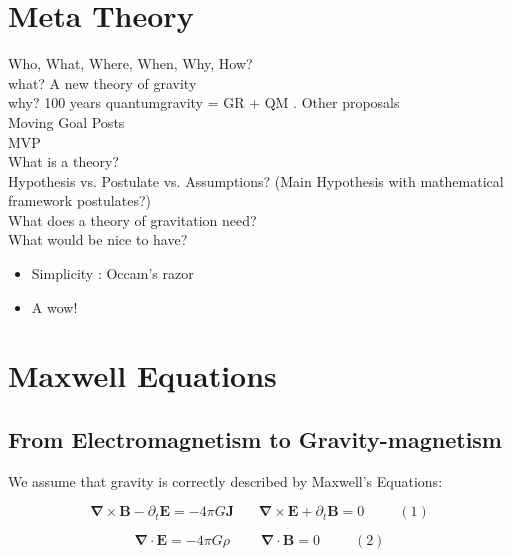 \documentclass {article}
\renewcommand\vec{\mathbf}
\let\OldS\nabla
\renewcommand{\nabla}{\boldsymbol{\OldS}}
\begin{document}
\section{Meta Theory}

Who, What, Where, When, Why, How?
\\[0.15in]
what?    A new theory of  gravity
\\
why?   100 years quantumgravity = GR + QM . Other proposals
\\[1in]

Moving Goal Posts
\\

MVP
\\

What is a theory?
\\[1in]

Hypothesis vs. Postulate vs. Assumptions? (Main Hypothesis with mathematical framework postulates?)
\\[1in]



What does a theory of gravitation need?
\\[2in]

What would be nice to have? 
\begin{itemize}
	\item Simplicity : Occam's razor
	\item A wow!
\end{itemize}

\vspace{10pt}





\newpage


\section{Maxwell Equations}
\subsection{From Electromagnetism to Gravity-magnetism}



We assume that gravity is correctly described by Maxwell's Equations:

$$\nabla \times \vec B  - \partial_t \vec E  = -4 \pi G \vec J ~~~~~~~~ \nabla \times \vec E + \partial_t \vec B = 0    ~~~~~~~~~~~ (1)$$

$$\nabla \cdot \vec E = -4 \pi G \rho ~~~~~~~~~~ \nabla \cdot \vec B = 0   ~~~~~~~~~~~ (2)$$
\end{document}
